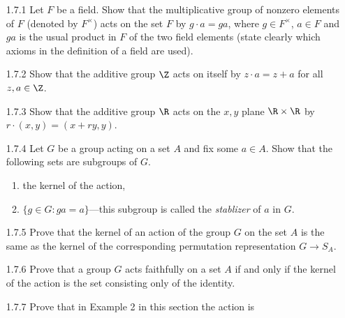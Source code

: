 \begin{enumerate}
   \item[1.7.1]   Let $F$ be a field. Show that the multiplicative group of
                  nonzero elements of $F$ (denoted by $F^\times$) acts on the
                  set $F$ by $g \cdot a = ga$, where $g \in F^\times$,
                  $a \in F$ and $ga$ is the usual product in $F$ of the two
                  field elements (state clearly which axioms in the definition
                  of a field are used).
   \item[1.7.2]   Show that the additive group $\Z$ acts on itself by
                  $z \cdot a = z + a$ for all $z, a \in \Z$.
   \item[1.7.3]   Show that the additive group $\R$ acts on the $x, y$ plane
                  $\R \times \R$ by $r \cdot (x, y) = (x + ry, y)$.
   \item[1.7.4]   Let $G$ be a group acting on a set $A$ and fix some $a \in A$.
                  Show that the following sets are subgroups of $G$.
                  \begin{enumerate}
                     \item the kernel of the action,
                     \item $\{g \in G : ga = a\}$---this subgroup is called the
                           \textit{stablizer} of $a$ in $G$.
                  \end{enumerate}
   \item[1.7.5]   Prove that the kernel of an action of the group $G$ on the set
                  $A$ is the same as the kernel of the corresponding permutation
                  representation $G \rightarrow S_A$.
   \item[1.7.6]   Prove that a group $G$ acts faithfully on a set $A$ if and
                  only if the kernel of the action is the set consisting only of
                  the identity.
   \item[1.7.7]   Prove that in Example 2 in this section the action is

\end{enumerate}
